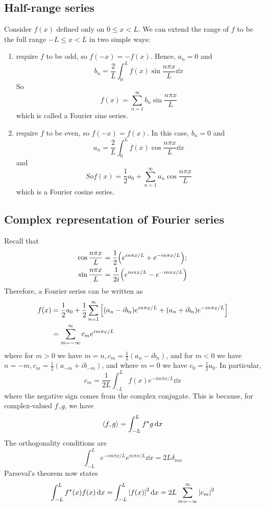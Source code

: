 \subsection{Half-range series}
Consider \( f(x) \) defined only on \( 0 \leq x < L \).
We can extend the range of \( f \) to be the full range \( -L \leq x < L \) in two simple ways:
\begin{enumerate}
	\item require \( f \) to be odd, so \( f(-x) = -f(x) \).
	      Hence, \( a_n = 0 \) and
	      \[
		      b_n = \frac{2}{L} \int_0^L f(x) \sin \frac{n \pi x}{L} \dd{x}
	      \]
	      So
	      \[
		      f(x) = \sum_{n=1}^\infty b_n \sin \frac{n\pi x}{L}
	      \]
	      which is called a Fourier sine series.
	\item require \( f \) to be even, so \( f(-x) = f(x) \).
	      In this case, \( b_n = 0 \) and
	      \[
		      a_n = \frac{2}{L} \int_0^L f(x) \cos \frac{n \pi x}{L} \dd{x}
	      \]
	      and
	      \[
		      So f(x) = \frac{1}{2}a_0 + \sum_{n=1}^\infty a_n \cos \frac{n\pi x}{L}
	      \]
	      which is a Fourier cosine series.
\end{enumerate}

\subsection{Complex representation of Fourier series}
Recall that
\begin{align*}
	\cos \frac{n \pi x}{L} & = \frac{1}{2}\qty(e^{i n \pi x / L} + e^{-i n \pi x / L}); \\
	\sin \frac{n \pi x}{L} & = \frac{1}{2i}\qty(e^{i n \pi x / L} - e^{-i n \pi x / L})
\end{align*}
Therefore, a Fourier series can be written as
\begin{align*}
	f(x) & = \frac{1}{2} a_0 + \frac{1}{2} \sum_{n=1}^\infty \qty[ (a_n - i b_n) e^{i n \pi x / L} + (a_n + i b_n) e^{-i n \pi x / L} ] \\
	     & = \sum_{m=-\infty}^\infty c_m e^{i m \pi x / L}
\end{align*}
where for \( m > 0 \) we have \( m=n, c_m = \frac{1}{2}(a_n - ib_n) \), and for \( m < 0 \) we have \( n = -m, c_m = \frac{1}{2}(a_{-m} + ib_{-m}) \), and where \( m = 0 \) we have \( c_0 = \frac{1}{2} a_0 \).
In particular,
\[
	c_m = \frac{1}{2L} \int_{-L}^L f(x) e^{-i m \pi x / L} \dd{x}
\]
where the negative sign comes from the complex conjugate.
This is because, for complex-valued \( f, g \), we have
\[
	\left\langle{f,g}\right\rangle = \int_{-L}^L f^\star g \dd{x}
\]
The orthogonality conditions are
\[
	\int_{-L}^L e^{-i m \pi x / L} e^{i n \pi x / L} \dd{x} = 2L \delta_{mn}
\]
Parseval's theorem now states
\[
	\int_{-L}^L f^\star(x) f(x) \dd{x} = \int_{-L}^L \abs{f(x)}^2 \dd{x} = 2L \sum_{m=-\infty}^\infty \abs{c_m}^2
\]

